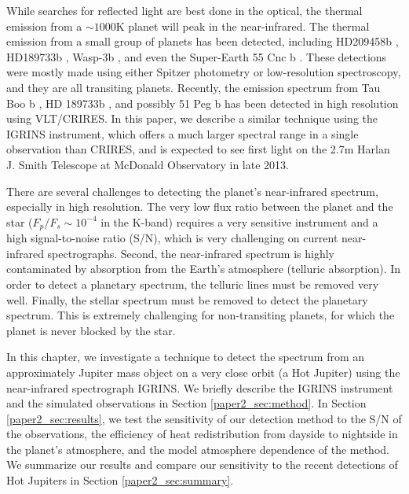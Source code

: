 While searches for reflected light are best done in the optical, the
thermal emission from a $\sim 1000$K planet will peak in the
near-infrared. The thermal emission from a small group of planets has been detected,
including HD209458b \citep[e.g.][]{Knutson2007, Swain2008,
  Cubillos2010}, HD189733b \citep[e.g.][]{Grillmair2007, Knutson2007_2,
  Char2008, Agol2010}, Wasp-3b \citep{Zhao2012}, and even the
Super-Earth 55 Cnc b \citep{Demory2012}. These detections were mostly made
using either Spitzer photometry or low-resolution spectroscopy, and
they are all transiting planets. Recently, the emission spectrum from Tau Boo b \citep{Brogi2012, Rodler2012}, HD 189733b \citep{deKok2013}, and possibly 51 Peg b \citep{Brogi2013} has been detected in high resolution using VLT/CRIRES. In this paper, we describe a similar technique using the IGRINS instrument, which offers a much larger spectral range in a single observation than CRIRES, and is expected to see first light on the 2.7m Harlan J. Smith Telescope at McDonald Observatory in late 2013.

There are several challenges to detecting the planet's near-infrared spectrum, especially in high resolution. The very low flux ratio between the planet and the star ($F_p/F_s \sim 10^{-4}$ in the K-band) requires a very sensitive instrument and a high signal-to-noise ratio (S/N), which is very challenging on current near-infrared spectrographs. Second, the near-infrared spectrum is highly contaminated by absorption from the Earth's atmosphere (telluric absorption). In order to detect a planetary spectrum, the telluric lines must be removed very well. Finally, the stellar spectrum must be removed to detect the planetary spectrum. This is extremely challenging for non-transiting planets, for which the planet is never blocked by the star. 

In this chapter, we investigate a technique to detect the spectrum from an approximately Jupiter mass object on a very close orbit (a Hot Jupiter) using the near-infrared spectrograph IGRINS. We briefly describe the IGRINS instrument and the simulated observations in Section \ref{paper2_sec:method}. In Section \ref{paper2_sec:results}, we test the sensitivity of our detection method to the S/N of the observations, the efficiency of heat redistribution from dayside to nightside in the planet's atmosphere, and the model atmosphere dependence of the method. We summarize our results and compare our sensitivity to the recent detections of Hot Jupiters in Section \ref{paper2_sec:summary}.


